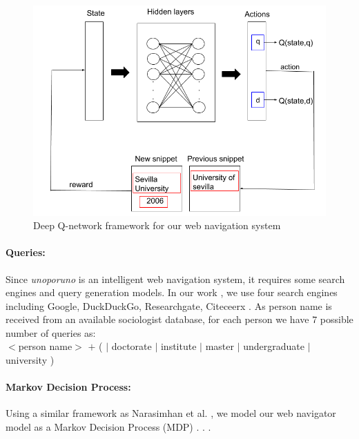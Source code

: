 \begin{figure}[!t]
\centering
\includegraphics[scale=0.3]{./images/neural-network.png}
\caption{Deep Q-network framework for our web navigation system  }
\label{fig:naviagte}
\end{figure}

\paragraph{Queries: }  Since \textit{unoporuno} is an intelligent web navigation system, it requires some search engines and query generation models. In our work , we use four search engines including Google, DuckDuckGo, Researchgate, Citeceerx  . As person name is received from an available sociologist database, for each person we have $7$ possible number of queries as: \\

$<$person name$>$ $+$ (  $|$ doctorate $|$ institute $|$ master $|$ undergraduate $|$ university ) 

\paragraph{Markov Decision Process: } Using a similar framework as Narasimhan et al. , we model our web navigator model as a Markov Decision Process (MDP) \cite{puterman1994}. . .

